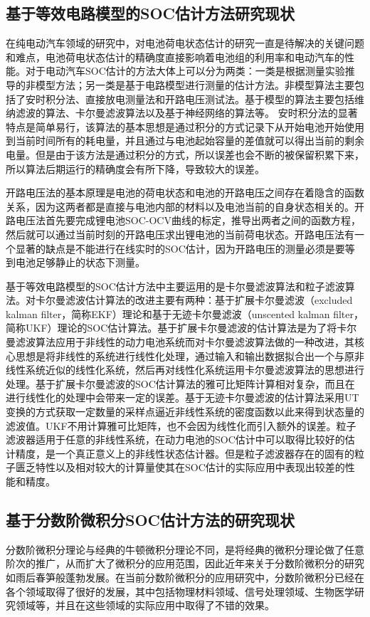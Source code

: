 	\subsection{基于等效电路模型的SOC估计方法研究现状}
	在纯电动汽车领域的研究中，对电池荷电状态估计的研究一直是待解决的关键问题和难点，电池荷电状态估计的精确度直接影响着电池组的利用率和电动汽车的性能。对于电动汽车SOC估计的方法大体上可以分为两类：一类是根据测量实验推导的非模型方法；另一类是基于电路模型进行测量的估计方法。非模型算法主要包括了安时积分法、直接放电测量法和开路电压测试法。基于模型的算法主要包括维纳滤波的算法、卡尔曼滤波算法以及基于神经网络的算法等。
安时积分法的显著特点是简单易行，该算法的基本思想是通过积分的方式记录下从开始电池开始使用到当前时间所有的耗电量，并且通过与电池起始容量的差值就可以得出当前的剩余电量。但是由于该方法是通过积分的方式，所以误差也会不断的被保留积累下来，所以算法后期运行的精确度会有所下降，导致较大的误差。

开路电压法的基本原理是电池的荷电状态和电池的开路电压之间存在着隐含的函数关系，因为这两者都是直接与电池内部的材料以及电池当前的自身状态相关的。开路电压法首先要完成锂电池SOC-OCV曲线的标定，推导出两者之间的函数方程，然后就可以通过当前时刻的开路电压求出锂电池的当前荷电状态。开路电压法有一个显著的缺点是不能进行在线实时的SOC估计，因为开路电压的测量必须是要等到电池足够静止的状态下测量。

	基于等效电路模型的SOC估计方法中主要运用的是卡尔曼滤波算法和粒子滤波算法。对卡尔曼滤波估计算法的改进主要有两种：基于扩展卡尔曼滤波（excluded kalman filter，简称EKF）理论和基于无迹卡尔曼滤波（unscented kalman filter，简称UKF）理论的SOC估计算法。基于扩展卡尔曼滤波的估计算法是为了将卡尔曼滤波算法应用于非线性的动力电池系统而对卡尔曼滤波算法做的一种改进，其核心思想是将非线性的系统进行线性化处理，通过输入和输出数据拟合出一个与原非线性系统近似的线性化系统，然后再对线性化系统运用卡尔曼滤波算法的思想进行处理。基于扩展卡尔曼滤波的SOC估计算法的雅可比矩阵计算相对复杂，而且在进行线性化的处理中会带来一定的误差。基于无迹卡尔曼滤波的估计算法采用UT变换的方式获取一定数量的采样点逼近非线性系统的密度函数以此来得到状态量的滤波值。UKF不用计算雅可比矩阵，也不会因为线性化而引入额外的误差。粒子滤波器适用于任意的非线性系统，在动力电池的SOC估计中可以取得比较好的估计精度，是一个真正意义上的非线性状态估计器。但是粒子滤波器存在的固有的粒子匮乏特性以及相对较大的计算量使其在SOC估计的实际应用中表现出较差的性能和精度。
	\subsection{基于分数阶微积分SOC估计方法的研究现状}
	分数阶微积分理论与经典的牛顿微积分理论不同，是将经典的微积分理论做了任意阶次的推广，从而扩大了微积分的应用范围，因此近年来关于分数阶微积分的研究如雨后春笋般蓬勃发展。在当前分数阶微积分的应用研究中，分数阶微积分已经在各个领域取得了很好的发展，其中包括物理材料领域、信号处理领域、生物医学研究领域等，并且在这些领域的实际应用中取得了不错的效果。

